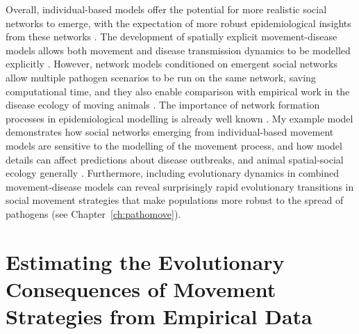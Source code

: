 Overall, individual-based models offer the potential for more realistic social networks to emerge, with the expectation of more robust epidemiological insights from these networks \citep[][]{lunn2021}.
The development of spatially explicit movement-disease models allows both movement and disease transmission dynamics to be modelled explicitly \citep{white2018b,white2018,scherer2020,gupte2022c}.
However, network models conditioned on emergent social networks allow multiple pathogen scenarios to be run on the same network, saving computational time, and they also enable comparison with empirical work in the disease ecology of moving animals \citep{wilber2022}.
The importance of network formation processes in epidemiological modelling is already well known \citep[][]{white2017,wilber2022}.
My example model demonstrates how social networks emerging from individual-based movement models are sensitive to the modelling of the movement process, and how model details can affect predictions about disease outbreaks, and animal spatial-social ecology generally \citep{webber2018,webber2022}.
Furthermore, including evolutionary dynamics in combined movement-disease models can reveal surprisingly rapid evolutionary transitions in social movement strategies that make populations more robust to the spread of pathogens (see Chapter~\ref{ch:pathomove}).



\section*{Estimating the Evolutionary Consequences of Movement Strategies from Empirical Data}

